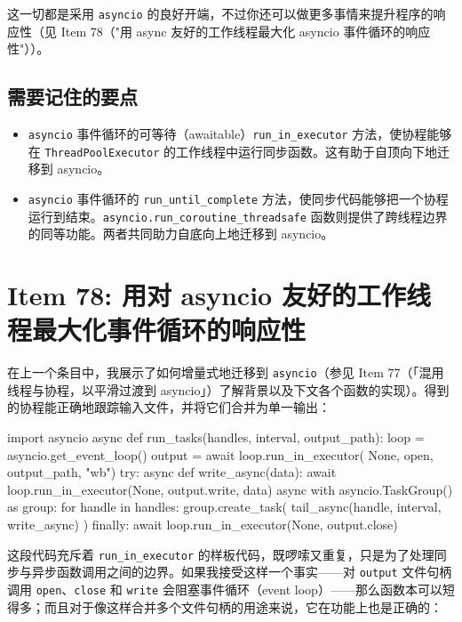 这一切都是采用 \texttt{asyncio} 的良好开端，不过你还可以做更多事情来提升程序的响应性（见 Item 78（"用 async 友好的工作线程最大化 asyncio 事件循环的响应性"））。

\subsection{需要记住的要点}

\begin{itemize}
\item \texttt{asyncio} 事件循环的可等待（awaitable）\texttt{run\_in\_executor} 方法，使协程能够在 \texttt{ThreadPoolExecutor} 的工作线程中运行同步函数。这有助于自顶向下地迁移到 asyncio。
\item \texttt{asyncio} 事件循环的 \texttt{run\_until\_complete} 方法，使同步代码能够把一个协程运行到结束。\texttt{asyncio.run\_coroutine\_threadsafe} 函数则提供了跨线程边界的同等功能。两者共同助力自底向上地迁移到 asyncio。
\end{itemize}

\section{Item 78: 用对 asyncio 友好的工作线程最大化事件循环的响应性}

在上一个条目中，我展示了如何增量式地迁移到 \texttt{asyncio}（参见 Item 77（「混用线程与协程，以平滑过渡到 asyncio」）了解背景以及下文各个函数的实现）。得到的协程能正确地跟踪输入文件，并将它们合并为单一输出：

\begin{codebox}[python]
import asyncio
async def run_tasks(handles, interval, output_path):
    loop = asyncio.get_event_loop()
     output = await loop.run_in_executor(
    None, open, output_path, "wb")
    try:
        async def write_async(data):
            await loop.run_in_executor(None, output.write, data)
        async with asyncio.TaskGroup() as group:
            for handle in handles:
                group.create_task(
                    tail_async(handle, interval, write_async)
                )
    finally:
        await loop.run_in_executor(None, output.close)
\end{codebox}

这段代码充斥着 \texttt{run\_in\_executor} 的样板代码，既啰嗦又重复，只是为了处理同步与异步函数调用之间的边界。如果我接受这样一个事实——对 \texttt{output} 文件句柄调用 \texttt{open}、\texttt{close} 和 \texttt{write} 会阻塞事件循环（event loop）——那么函数本可以短得多；而且对于像这样合并多个文件句柄的用途来说，它在功能上也是正确的：

